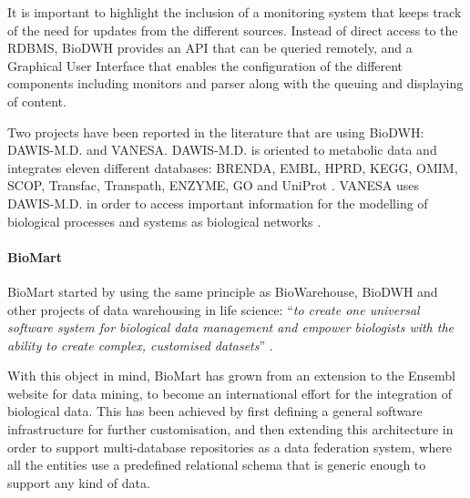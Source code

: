 It is important to highlight the inclusion of a monitoring system that keeps track of the need for updates from the different sources. Instead of direct access to the RDBMS, BioDWH provides an API that can be queried remotely, and a Graphical User Interface that enables the configuration of the different components including monitors and parser along with the queuing and displaying of content.

Two projects have been reported in the literature that are using BioDWH: DAWIS-M.D. and VANESA. DAWIS-M.D. is oriented to metabolic data and integrates eleven different databases: BRENDA, EMBL, HPRD, KEGG, OMIM, SCOP, Transfac, Transpath, ENZYME, GO and UniProt \cite{HIP2010}. VANESA uses DAWIS-M.D. in order to access important information for the modelling of biological processes and systems as biological networks \cite{BRI2014}.

\paragraph{BioMart}
BioMart started by using the same principle as BioWarehouse, BioDWH and other projects of data warehousing in life science: ``\emph{to create one universal software system for biological data management and empower biologists with the ability to create complex, customised datasets}'' \cite{KAS2011}.

With this object in mind, BioMart has grown from an extension to the Ensembl website for data mining, to become an international effort for the integration of biological data. This has been achieved by first defining a general software infrastructure for further customisation, and then extending this architecture in order to support multi-database repositories as a data federation system, where all the entities use a predefined relational schema that is generic enough to support any kind of data.

